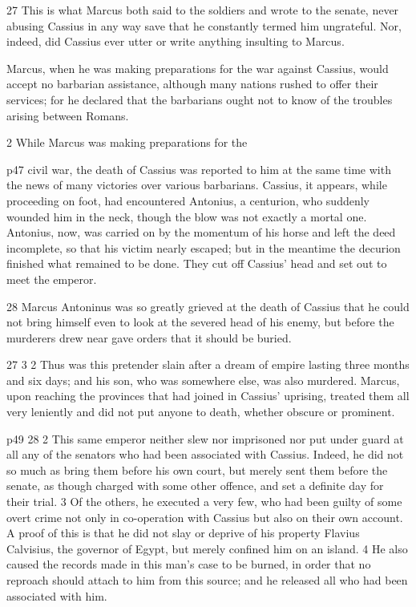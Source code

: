 27
This is what Marcus both said to the soldiers and wrote to the senate, never abusing Cassius in any way save that he constantly termed him ungrateful. Nor, indeed, did Cassius ever utter or write anything insulting to Marcus.

Marcus, when he was making preparations for the war against Cassius, would accept no barbarian assistance, although many nations rushed to offer their services; for he declared that the barbarians ought not to know of the troubles arising between Romans.

2
While Marcus was making preparations for the

p47 civil war, the death of Cassius was reported to him at the same time with the news of many victories over various barbarians.\texthebrew{⁠} Cassius, it appears, while proceeding on foot, had encountered Antonius, a centurion, who suddenly wounded him in the neck, though the blow was not exactly a mortal one. Antonius, now, was carried on by the momentum of his horse and left the deed incomplete, so that his victim nearly escaped; but in the meantime the decurion finished what remained to be done. They cut off Cassius' head and set out to meet the emperor.

28
Marcus Antoninus was so greatly grieved at the death of Cassius that he could not bring himself even to look at the severed head of his enemy, but before the murderers drew near gave orders that it should be buried.

27
3 2 Thus was this pretender slain after a dream of empire lasting three months and six days; and his son, who was somewhere else, was also murdered. Marcus, upon reaching the provinces that had joined in Cassius' uprising, treated them all very leniently and did not put anyone to death, whether obscure or prominent.

p49
28 2
This same emperor neither slew nor imprisoned nor put under guard at all any of the senators who had been associated with Cassius. Indeed, he did not so much as bring them before his own court, but merely sent them before the senate, as though charged with some other offence, and set a definite day for their trial. 3 Of the others, he executed a very few, who had been guilty of some overt crime not only in co-operation with Cassius but also on their own account. A proof of this is that he did not slay or deprive of his property Flavius Calvisius,\texthebrew{⁠} the governor of Egypt, but merely confined him on an island. 4 He also caused the records made in this man's case to be burned, in order that no reproach should attach to him from this source; and he released all who had been associated with him.

